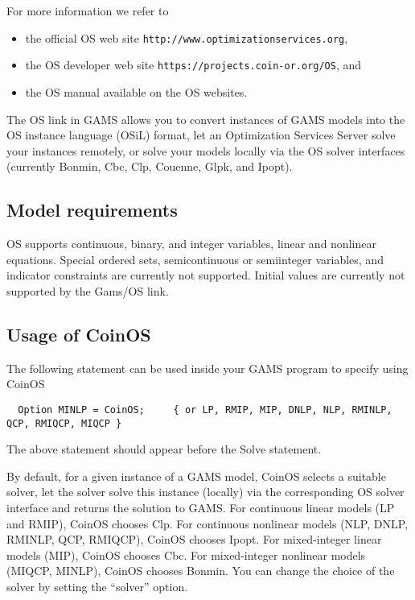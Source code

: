 For more information we refer to
\begin{itemize}
\item the official OS web site \texttt{http://www.optimizationservices.org},
\item the OS developer web site \texttt{https://projects.coin-or.org/OS}, and
\item the OS manual available on the OS websites.
\end{itemize}

The OS link in GAMS allows you to convert instances of GAMS models into the OS instance language (OSiL) format, let an Optimization Services Server solve your instances remotely, or solve your models locally via the OS solver interfaces (currently Bonmin, Cbc, Clp, Couenne, Glpk, and Ipopt).

\subsection{Model requirements}

OS supports continuous, binary, and integer variables, linear and nonlinear equations.
Special ordered sets, semicontinuous or semiinteger variables, and indicator constraints are currently not supported.
Initial values are currently not supported by the Gams/OS link.

\subsection{Usage of CoinOS}

The following statement can be used inside your GAMS program to specify using CoinOS
\begin{verbatim}
  Option MINLP = CoinOS;     { or LP, RMIP, MIP, DNLP, NLP, RMINLP, QCP, RMIQCP, MIQCP }
\end{verbatim}

The above statement should appear before the Solve statement.

By default, for a given instance of a GAMS model, CoinOS selects a suitable solver, let the solver solve this instance (locally) via the corresponding OS solver interface and returns the solution to GAMS.
For continuous linear models (LP and RMIP), CoinOS chooses Clp.
For continuous nonlinear models (NLP, DNLP, RMINLP, QCP, RMIQCP), CoinOS chooses Ipopt.
For mixed-integer linear models (MIP), CoinOS chooses Cbc.
For mixed-integer nonlinear models (MIQCP, MINLP), CoinOS chooses Bonmin.
You can change the choice of the solver by setting the ``solver'' option.

